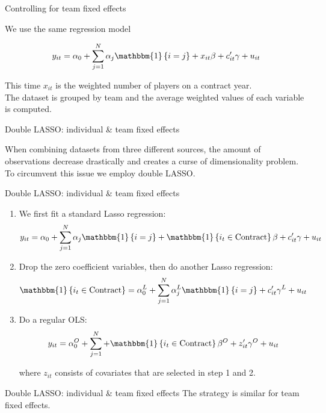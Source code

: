 \documentclass[12pt,aspectratio=916]{beamer} %
\begin{document}
\begin{frame}{Controlling for team fixed effects}

We use the same regression model

\[
y_{it} = \alpha_0 + \sum_{j=1}^N \alpha_j \mathbbm{1}\left\lbrace i= j \right\rbrace + x_{it}\beta + c_{it}'\gamma + u_{it}
\]

This time $x_{it}$ is the weighted number of players on a contract year.
\\

The dataset is grouped by team and the average weighted values of each variable is computed.

\end{frame}

\begin{frame}{Double LASSO: individual \& team fixed effects}

When combining datasets from three different sources, the amount of observations decrease drastically and creates a curse of dimensionality problem. To circumvent this issue we employ double LASSO.

\end{frame}

\begin{frame}{Double LASSO: individual \& team fixed effects}

\begin{enumerate}
	\item We first fit a standard Lasso regression: \[
	y_{it} = \alpha_0 + \sum_{j=1}^N \alpha_j \mathbbm{1}\left\lbrace i= j \right\rbrace + \mathbbm{1}\left\lbrace i_t\in \mathrm{Contract} \right\rbrace\beta + c_{it}'\gamma + u_{it}
	\]
	\item Drop the zero coefficient variables, then do another Lasso regression: \[
	\mathbbm{1}\left\lbrace i_t\in \mathrm{Contract} \right\rbrace = \alpha_0^L + \sum_{j=1}^N \alpha^L_j \mathbbm{1}\left\lbrace i= j \right\rbrace + c_{it}'\gamma^L + u_{it}
	\]
	\item Do a regular OLS: \[
	y_{it} = \alpha_0^O + \sum_{j=1}^N + \mathbbm{1}\left\lbrace i_t\in \mathrm{Contract} \right\rbrace\beta^O + z_{it}'\gamma^O + u_{it}
	\]
	
	where $z_{it}$ consists of covariates that are selected in step 1 and 2.
\end{enumerate}

\end{frame}

\begin{frame}{Double LASSO: individual \& team fixed effects}
	The strategy is similar for team fixed effects.

\end{frame}
\end{document}
